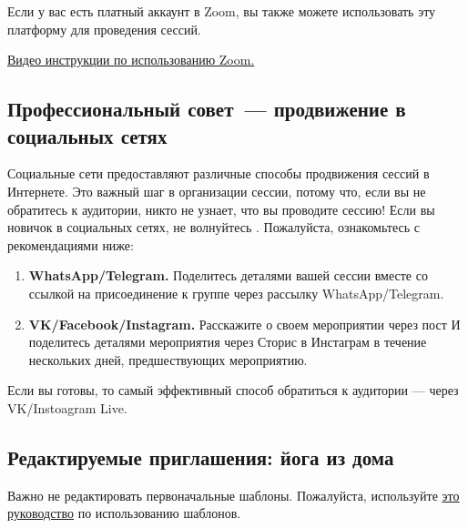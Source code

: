Если у вас есть платный аккаунт в Zoom, вы также можете использовать эту платформу для проведения сессий.

\href{https://drive.google.com/file/d/1aqEODSOCmS3BdFkcbs-sf_Aa1cjpd37d/view?usp=sharing}{Видео инструкции по использованию Zoom.}

\subsection*{Профессиональный совет~--- продвижение в социальных сетях}
\label{sec:profAdv2}

Социальные сети предоставляют различные способы продвижения сессий в Интернете. Это важный шаг в организации сессии, потому что, если вы не обратитесь к аудитории, никто не узнает, что вы проводите сессию!
Если вы новичок в социальных сетях, не волнуйтесь \faSmileO. Пожалуйста, ознакомьтесь с рекомендациями ниже:
\begin{enumerate}
    \item \textbf{WhatsApp/Telegram.} Поделитесь деталями вашей сессии вместе со ссылкой на присоединение к группе через рассылку WhatsApp/Telegram.
    \item \textbf{VK/Facebook/Instagram.} Расскажите о своем мероприятии через пост И поделитесь деталями мероприятия через Сторис в Инстаграм в течение нескольких дней, предшествующих мероприятию.
\end{enumerate}


\faLightbulbO Если вы готовы, то самый эффективный способ обратиться к аудитории — через VK/Instoagram Live.

\subsection*{Редактируемые приглашения: йога из дома}
\label{sec:invites}
Важно не редактировать первоначальные шаблоны. Пожалуйста, используйте \href{https://docs.google.com/file/d/1sdxy89oBTJ6PNSrEM1bYZ5grWjE6ot-6/edit?usp=docslist_api&filetype=msword}{это руководство} по использованию шаблонов. 
